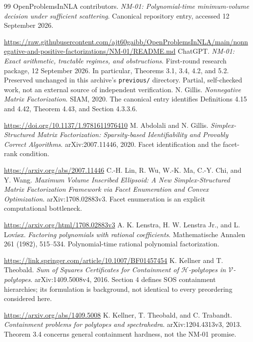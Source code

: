\documentclass[11pt]{article}
\theoremstyle{definition}\newtheorem{definition}[theorem]{Definition}
\begin{document}
\begin{thebibliography}{99}
 OpenProblemsInNLA contributors. \emph{NM-01: Polynomial-time minimum-volume decision under sufficient scattering}. Canonical repository entry, accessed 12 September 2026.\par
\url{https://raw.githubusercontent.com/ajt60gaibb/OpenProblemsInNLA/main/nonnegative-and-positive-factorizations/NM-01/README.md}
 ChatGPT. \emph{NM-01: Exact arithmetic, tractable regimes, and obstructions}. First-round research package, 12 September 2026. In particular, Theorems 3.1, 3.4, 4.2, and 5.2. Preserved unchanged in this archive's \texttt{previous/} directory. Partial, self-checked work, not an external source of independent verification.
 N. Gillis. \emph{Nonnegative Matrix Factorization}. SIAM, 2020. The canonical entry identifies Definitions 4.15 and 4.42, Theorem 4.43, and Section 4.3.3.6.\par
\url{https://doi.org/10.1137/1.9781611976410}
 M. Abdolali and N. Gillis. \emph{Simplex-Structured Matrix Factorization: Sparsity-based Identifiability and Provably Correct Algorithms}. arXiv:2007.11446, 2020. Facet identification and the facet-rank condition.\par
\url{https://arxiv.org/abs/2007.11446}
 C.-H. Lin, R. Wu, W.-K. Ma, C.-Y. Chi, and Y. Wang. \emph{Maximum Volume Inscribed Ellipsoid: A New Simplex-Structured Matrix Factorization Framework via Facet Enumeration and Convex Optimization}. arXiv:1708.02883v3. Facet enumeration is an explicit computational bottleneck.\par
\url{https://arxiv.org/html/1708.02883v3}
 A. K. Lenstra, H. W. Lenstra Jr., and L. Lov\'asz. \emph{Factoring polynomials with rational coefficients}. Mathematische Annalen 261 (1982), 515--534. Polynomial-time rational polynomial factorization.\par
\url{https://link.springer.com/article/10.1007/BF01457454}
 K. Kellner and T. Theobald. \emph{Sum of Squares Certificates for Containment of $\mathcal H$-polytopes in $\mathcal V$-polytopes}. arXiv:1409.5008v4, 2016. Section 4 defines SOS containment hierarchies; its formulation is background, not identical to every preordering considered here.\par
\url{https://arxiv.org/abs/1409.5008}
 K. Kellner, T. Theobald, and C. Trabandt. \emph{Containment problems for polytopes and spectrahedra}. arXiv:1204.4313v3, 2013. Theorem 3.4 concerns general containment hardness, not the NM-01 promise.\par

\end{thebibliography}
\end{document}
